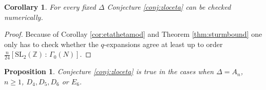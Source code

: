 \documentclass[11pt,a4paper]{amsart}
\newtheorem{proposition}[theorem]{Proposition}
\newtheorem{corollary}[theorem]{Corollary}
\theoremstyle{definition}
\newcommand{\SZ}{\mathbb{Z}}                    %
\begin{document}
\begin{corollary}
For every fixed $\Delta$ Conjecture \ref{conj:zloceta} can be checked numerically.
\end{corollary}
\begin{proof}
Because of Corollay \ref{cor:etathetamod} and Theorem \ref{thm:sturmbound}
one only has to check whether the $q$-expansions agree at least up to order $\frac{n}{24} [\mathrm{SL}_2(\SZ) \, : \, \Gamma_0(N) ]$.
\end{proof}


\begin{proposition}
\label{prop:zlocetacheck}
Conjecture \ref{conj:zloceta} is true in the cases when $\Delta=A_n$, $n\geq 1$, $D_4, D_5, D_6$ or $E_6$.
 \end{proposition}
\end{document}
